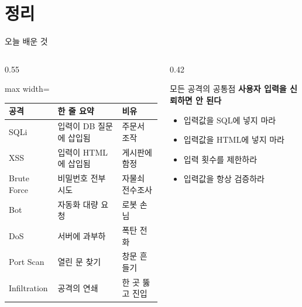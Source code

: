 \documentclass[aspectratio=169,10pt]{beamer}
\newcommand{\hlt}[1]{\textcolor{accent}{\textbf{#1}}}
\begin{document}
\section{정리}

\begin{frame}{오늘 배운 것}

\begin{columns}[T]
\begin{column}{0.55\textwidth}
\begin{adjustbox}{max width=\textwidth}
\footnotesize
\begin{tabular}{lll}
\toprule
\textbf{공격} & \textbf{한 줄 요약} & \textbf{비유} \\
\midrule
\rowcolor{layer3} SQLi & 입력이 DB 질문에 삽입됨 & 주문서 조작 \\
\rowcolor{layer3} XSS & 입력이 HTML에 삽입됨 & 게시판에 함정 \\
\rowcolor{layer1} Brute Force & 비밀번호 전부 시도 & 자물쇠 전수조사 \\
\rowcolor{layer2} Bot & 자동화 대량 요청 & 로봇 손님 \\
\rowcolor{layer2} DoS & 서버에 과부하 & 폭탄 전화 \\
\rowcolor{layer2} Port Scan & 열린 문 찾기 & 창문 흔들기 \\
\rowcolor{layer3} Infiltration & 공격의 연쇄 & 한 곳 뚫고 진입 \\
\bottomrule
\end{tabular}
\end{adjustbox}
\end{column}
\begin{column}{0.42\textwidth}
\begin{alertblock}{모든 공격의 공통점}
\hlt{사용자 입력을 신뢰하면 안 된다}
\begin{itemize}
    \item 입력값을 SQL에 넣지 마라
    \item 입력값을 HTML에 넣지 마라
    \item 입력 횟수를 제한하라
    \item 입력값을 항상 검증하라
\end{itemize}
\end{alertblock}
\end{column}
\end{columns}
\end{frame}
\end{document}
